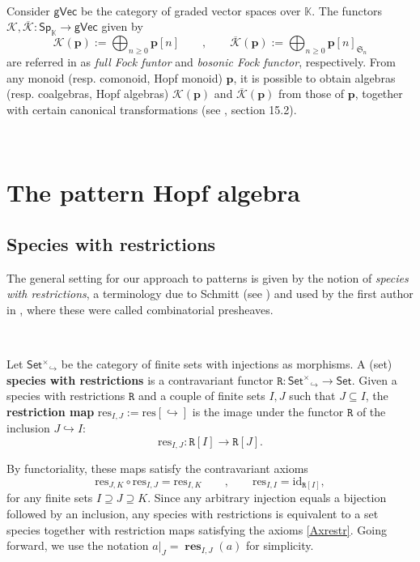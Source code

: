 \documentclass[12pt, reqno]{amsart}
\theoremstyle{definition}
\DeclareMathOperator{\rest}{\mathbf{res}}
\newcommand{\Fset}{\mathsf{Set^{\times}}}
\newcommand{\gVec}{\mathsf{gVec}}
\newcommand{\Set}{\mathsf{Set}}
\newcommand{\Ssk}{\mathsf{Sp}_\Kb} %
\newcommand{\Kb}{\mathbb{K}}
\newcommand{\prR}{\mathtt{R}}
\newcommand{\tp}{\mathbf{p}}
\newcommand{\Kc}{\mathcal{K}}
\newcommand{\Kcb}{\overline{\Kc}}
\begin{document}
\


Consider $\gVec$ be the category of graded vector spaces over $\mathbb{K}$. The functors $\Kc, \Kcb: \Ssk \to \gVec$ given by 
\begin{equation}
    \Kc(\tp):=\bigoplus_{n \geq 0}\tp[n] \qquad , \qquad \Kcb(\tp):= \bigoplus_{n \geq 0}\tp[n]_{\mathfrak{S}_n}
\end{equation}
are referred in \cite{AM2010} as \emph{full Fock funtor} and \emph{bosonic Fock functor}, respectively. From any monoid (resp. comonoid, Hopf monoid) $\tp$, it is possible to obtain algebras (resp. coalgebras, Hopf algebras) $\Kc(\tp)$ and $\Kcb(\tp)$ from those of $\tp$, together with certain canonical transformations (see \cite{AM2010}, section 15.2).

\

\section{The pattern Hopf algebra \label{sec:pattern_algebra_contruction}}

\subsection{Species with restrictions}
The general setting for our approach to patterns is given by the notion of \emph{species with restrictions}, a terminology due to Schmitt (see \cite{Schmitt1993}) and used by the first author in \cite{Penaguiao2020}, where these were called combinatorial presheaves.

\

Let $\Fset_{\!\!\!\!\!\hookrightarrow}$ be the category of finite sets with injections as morphisms. A (set) {\bf species with restrictions} is a contravariant functor $\prR:\Fset_{\!\!\!\!\!\hookrightarrow} \to \Set$. Given a species with restrictions $\prR$ and a couple of finite sets $I,J$ such that $J \subseteq I$, the {\bf restriction map} $\text{res}_{I,J}:=\text{res}[\hookrightarrow]$ is the image under the functor $\prR$ of the inclusion $J \hookrightarrow I$:
\[\text{res}_{I,J}: \prR[I]\to \prR[J].\]

By functoriality, these maps satisfy the contravariant axioms
\begin{equation}\label{Axrestr}
    \text{res}_{J,K}\circ\text{res}_{I,J}=\text{res}_{I,K} \qquad , \qquad \text{res}_{I,I}=\text{id}_{\prR[I]},
\end{equation}
for any finite sets $I \supseteq J \supseteq K$. 
Since any arbitrary injection equals a bijection followed by an inclusion, any species with restrictions is equivalent to a set species together with restriction maps satisfying the axioms \eqref{Axrestr}.
Going forward, we use the notation $a|_J = \rest_{I, J}(a)$ for simplicity.
\end{document}
